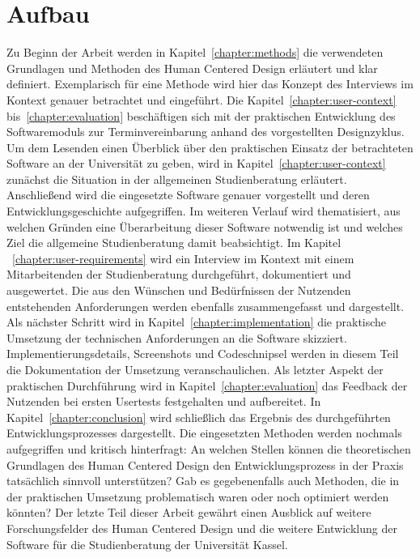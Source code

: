 \section{Aufbau}
Zu Beginn der Arbeit werden in Kapitel~\ref{chapter:methods} die
verwendeten Grundlagen und Methoden des Human Centered Design erläutert
und klar definiert. Exemplarisch für eine Methode wird hier das Konzept des
Interviews im Kontext genauer betrachtet und eingeführt. Die
Kapitel~\ref{chapter:user-context} bis~\ref{chapter:evaluation} beschäftigen sich
mit der praktischen Entwicklung des Softwaremoduls zur Terminvereinbarung
anhand des vorgestellten Designzyklus. Um dem Lesenden einen Überblick über den
praktischen Einsatz der betrachteten Software an der Universität zu geben, wird
in Kapitel~\ref{chapter:user-context} zunächst die Situation in der allgemeinen
Studienberatung erläutert. Anschließend wird die eingesetzte Software genauer
vorgestellt und deren Entwicklungsgeschichte aufgegriffen. Im weiteren Verlauf
wird thematisiert, aus welchen Gründen eine Überarbeitung dieser
Software notwendig ist und welches Ziel die allgemeine Studienberatung damit
beabsichtigt. Im Kapitel ~\ref{chapter:user-requirements} wird ein Interview im
Kontext mit einem Mitarbeitenden der Studienberatung durchgeführt, dokumentiert
und ausgewertet. Die aus den Wünschen und Bedürfnissen der Nutzenden
entstehenden Anforderungen werden ebenfalls zusammengefasst und dargestellt. Als nächster Schritt wird in Kapitel~\ref{chapter:implementation} die
praktische Umsetzung der technischen Anforderungen an die Software skizziert. Implementierungsdetails, Screenshots und Codeschnipsel werden in diesem
Teil die Dokumentation der Umsetzung veranschaulichen. Als letzter Aspekt der
praktischen Durchführung wird in Kapitel~\ref{chapter:evaluation} das Feedback
der Nutzenden bei ersten \glspl{Usertest} festgehalten und aufbereitet. In
Kapitel~\ref{chapter:conclusion} wird schließlich das Ergebnis des
durchgeführten Entwicklungsprozesses dargestellt. Die eingesetzten Methoden
werden nochmals aufgegriffen und kritisch hinterfragt: An welchen Stellen
können die theoretischen Grundlagen des Human Centered Design den
Entwicklungsprozess in der Praxis tatsächlich sinnvoll unterstützen? Gab es
gegebenenfalls auch Methoden, die in der praktischen Umsetzung problematisch waren
oder noch optimiert werden könnten? Der letzte Teil dieser Arbeit gewährt einen Ausblick auf weitere Forschungsfelder des Human Centered
Design und die weitere Entwicklung der Software für die Studienberatung der
Universität Kassel.
